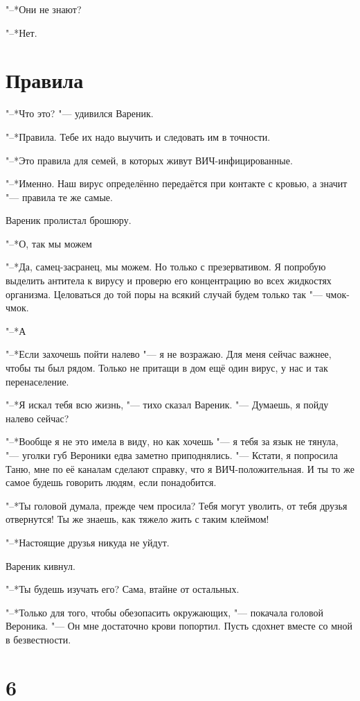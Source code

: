 "--*Они не знают?

"--*Нет.

\section{Правила}

"--*Что это? "--- удивился Вареник.

"--*Правила.
Тебе их надо выучить и следовать им в точности.

"--*Это правила для семей, в которых живут ВИЧ-инфицированные.

"--*Именно.
Наш вирус определённо передаётся при контакте с кровью, а значит "--- правила те же самые.

Вареник пролистал брошюру.

"--*О, так мы можем\ldotsq

"--*Да, самец-засранец, мы можем.
Но только с презервативом.
Я попробую выделить антитела к вирусу и проверю его концентрацию во всех жидкостях организма.
Целоваться до той поры на всякий случай будем только так "--- чмок-чмок.

"--*А\ldotst

"--*Если захочешь пойти налево "--- я не возражаю.
Для меня сейчас важнее, чтобы ты был рядом.
Только не притащи в дом ещё один вирус, у нас и так перенаселение.

"--*Я искал тебя всю жизнь, "--- тихо сказал Вареник.
"--- Думаешь, я пойду налево сейчас?

"--*Вообще я не это имела в виду, но как хочешь "--- я тебя за язык не тянула, "--- уголки губ Вероники едва заметно приподнялись.
"--- Кстати, я попросила Таню, мне по её каналам сделают справку, что я ВИЧ-положительная.
И ты то же самое будешь говорить людям, если понадобится.

"--*Ты головой думала, прежде чем просила?
Тебя могут уволить, от тебя друзья отвернутся!
Ты же знаешь, как тяжело жить с таким клеймом!

"--*Настоящие друзья никуда не уйдут.

Вареник кивнул.

"--*Ты будешь изучать его?
Сама, втайне от остальных.

"--*Только для того, чтобы обезопасить окружающих, "--- покачала головой Вероника.
"--- Он мне достаточно крови попортил.
Пусть сдохнет вместе со мной в безвестности.

\section{6}

